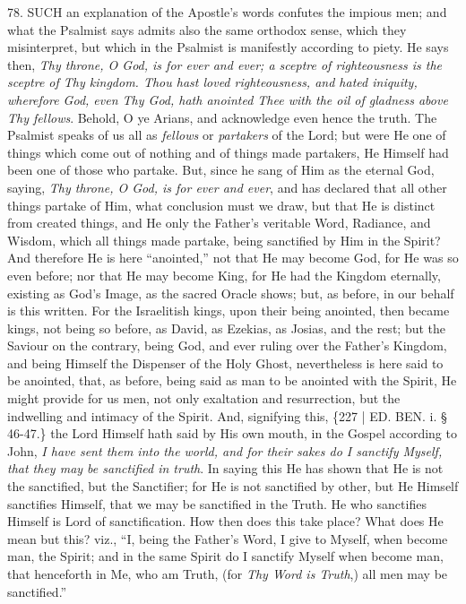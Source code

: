 78. SUCH
an explanation of the Apostle's words confutes the impious men; and
what the Psalmist says admits also the same orthodox sense, which they
misinterpret, but which in the Psalmist is manifestly according to
piety. He says then, \emph{Thy throne, O God, is for ever and ever; a
sceptre of righteousness is the sceptre of Thy kingdom. Thou hast
loved righteousness, and hated iniquity, wherefore God, even Thy God,
hath anointed Thee with the oil of gladness above Thy fellows}.
Behold, O ye Arians, and acknowledge even hence the truth. The
Psalmist speaks of us all as \emph{fellows} or \emph{partakers} of the
Lord; but were He one of things which come out of nothing and of
things made partakers, He Himself had been one of those who partake.
But, since he sang of Him as the eternal God, saying, \emph{Thy throne, O
God, is for ever and ever}, and has declared that all other things
partake of Him, what conclusion must we draw, but that He is distinct
from created things, and He only the Father's veritable Word,
Radiance, and Wisdom, which all things made partake, being sanctified
by Him in the Spirit? And therefore He is here ``anointed,'' not that He
may become God, for He was so even before; nor that He may become
King, for He had the Kingdom eternally, existing as God's Image, as
the sacred Oracle shows; but, as before, in our behalf is this
written. For the Israelitish kings, upon their being anointed, then
became kings, not being so before, as David, as Ezekias, as Josias,
and the rest; but the Saviour on the contrary, being God, and ever
ruling over the Father's Kingdom, and being Himself the Dispenser of
the Holy Ghost, nevertheless is here said to be anointed, that, as
before, being said as man to be anointed with the Spirit, He might
provide for us men, not only exaltation and resurrection, but the
indwelling and intimacy of the Spirit. And, signifying this, \{227 | ED.
BEN.
i. § 46-47.\} the Lord Himself hath said by His own mouth, in the
Gospel according to John, \emph{I have sent them into the world, and for
their sakes do I sanctify Myself, that they may be sanctified in truth}.
In saying this He has shown that He is not the sanctified, but the
Sanctifier; for He is not sanctified by other, but He Himself
sanctifies Himself, that we may be sanctified in the Truth. He who
sanctifies Himself is Lord of sanctification. How then does this take
place? What does He mean but this? viz., ``I, being the Father's Word,
I give to Myself, when become man, the Spirit; and in the same Spirit
do I sanctify Myself when become man, that henceforth in Me, who am
Truth, (for \emph{Thy Word is Truth},) all men may be sanctified.''

